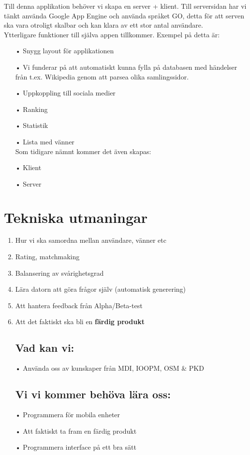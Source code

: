 \documentclass[a4paper,11pt]{article}
\begin{document}
\noindent
Till denna applikation behöver vi skapa en server + klient. Till serversidan har vi tänkt använda Google App Engine och använda språket GO, detta för att serven ska vara otroligt skalbar och kan klara av ett stor antal användare.\\
Ytterligare funktioner till själva appen tillkommer. Exempel på detta är:
\begin{itemize}
\item[•] Snygg layout för applikationen
\item[•] Vi funderar på att automatiskt kunna fylla på databasen med händelser från t.ex. Wikipedia genom att parsea olika samlingssidor.
\item[•] Uppkoppling till sociala medier
\item[•] Ranking
\item[•] Statistik
\item[•] Lista med vänner\\

Som tidigare nämnt kommer det även skapas:\\

\item[•] Klient
\item[•] Server
\end{itemize}

\section{Tekniska utmaningar}
\begin{enumerate}
\item Hur vi ska samordna mellan användare, vänner etc
\item Rating, matchmaking
\item Balansering av svårighetsgrad
\item Lära datorn att göra frågor själv (automatisk generering)
\item Att hantera feedback från Alpha/Beta-test
\item Att det faktiskt ska bli en \textbf{färdig produkt}

\subsection{Vad kan vi:}
\item[•] Använda oss av kunskaper från MDI, IOOPM, OSM \& PKD

\subsection{Vi vi kommer behöva lära oss:}
\item[•] Programmera för mobila enheter
\item[•] Att faktiskt ta fram en färdig produkt
\item[•] Programmera interface på ett bra sätt
\end{enumerate}
\end{document}

